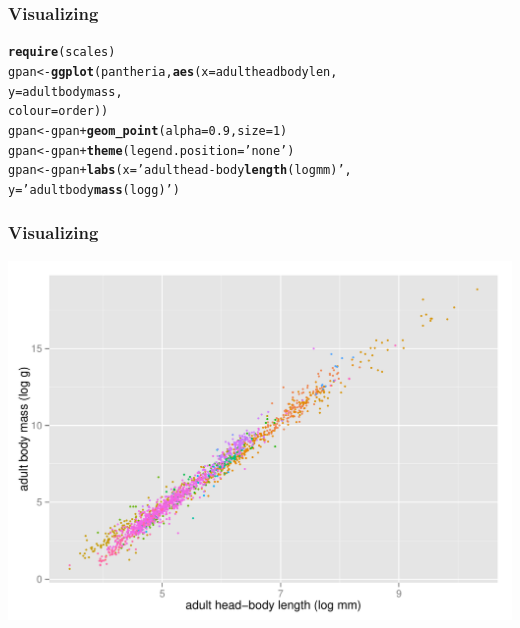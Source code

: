\documentclass{beamer}\usepackage{graphicx, color}
\makeatletter
\def\maxwidth{ %
  \ifdim\Gin@nat@width>\linewidth
    \linewidth
  \else
    \Gin@nat@width
  \fi
}
\newcommand{\hlfunctioncall}[1]{\textcolor[rgb]{0.501960784313725,0,0.329411764705882}{\textbf{#1}}}%
\newcommand{\hlstring}[1]{\textcolor[rgb]{0.6,0.6,1}{#1}}%
\newenvironment{kframe}{%
 \def\at@end@of@kframe{}%
 \ifinner\ifhmode%
  \def\at@end@of@kframe{\end{minipage}}%
  \begin{minipage}{\columnwidth}%
 \fi\fi%
 \def\FrameCommand##1{\hskip\@totalleftmargin \hskip-\fboxsep
 \colorbox{shadecolor}{##1}\hskip-\fboxsep
     \hskip-\linewidth \hskip-\@totalleftmargin \hskip\columnwidth}%
 \MakeFramed {\advance\hsize-\width
   \@totalleftmargin\z@ \linewidth\hsize
   \@setminipage}}%
 {\par\unskip\endMakeFramed%
 \at@end@of@kframe}
\newenvironment{knitrout}{}{} %
\makeatother
\begin{document}
\begin{frame}[fragile]
  \frametitle{Visualizing}
\begin{knitrout}\scriptsize
{}\color{fgcolor}\begin{kframe}
\begin{alltt}
\hlfunctioncall{require}(scales)
gpan <- \hlfunctioncall{ggplot}(pantheria, \hlfunctioncall{aes}(x = adultheadbodylen,
                              y = adultbodymass,
                              colour = order))
gpan <- gpan + \hlfunctioncall{geom_point}(alpha = 0.9,  size = 1)
gpan <- gpan + \hlfunctioncall{theme}(legend.position = \hlstring{'none'})
gpan <- gpan + \hlfunctioncall{labs}(x = \hlstring{'adult head-body \hlfunctioncall{length} (log mm)'},
                    y = \hlstring{'adult body \hlfunctioncall{mass} (log g)'})
\end{alltt}
\end{kframe}
\end{knitrout}

\end{frame}

\begin{frame}[fragile]
  \frametitle{Visualizing}
\begin{knitrout}\scriptsize
{}\color{fgcolor}
\includegraphics[width=\maxwidth]{figure/unnamed-chunk-21} 

\end{knitrout}

\end{frame}
\end{document}
